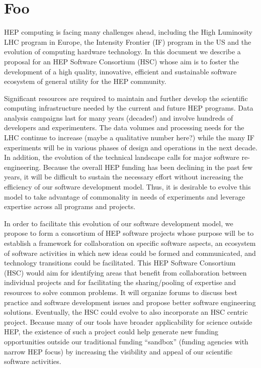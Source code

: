 \documentclass[12pt,letterpaper,fleqn]{article}
\begin{document}
\linenumbers

\section{Foo}
\label{sec:intro}

HEP computing is facing many challenges ahead, including the High
Luminosity LHC program in Europe, the Intensity Frontier (IF) program
in the US and the evolution of computing hardware technology. In
this document we describe a proposal for an HEP Software Consortium
(HSC) whose aim is to foster the development of a high quality,
innovative, efficient and sustainable software ecosystem of general
utility for the HEP community.

Significant resources are required to maintain and further develop
the scientific computing infrastructure needed by the current and
future HEP programs.  Data analysis campaigns last for many years
(decades!) and involve hundreds of developers and experimenters.
The data volumes and processing needs for the LHC continue to
increase (maybe a qualitative number here?) while the many IF
experiments will be in various phases of design and operations in
the next decade.  In addition, the evolution of the technical
landscape calls for major software re-engineering.  Because the
overall HEP funding has been declining in the past few years, it
will be difficult to sustain the necessary effort without increasing
the efficiency of our software development model.   Thus, it is
desirable to evolve this model to take advantage of commonality in
needs of experiments and leverage expertise across all programs and
projects.

In order to facilitate this evolution of our software development
model, we propose to form a consortium of HEP software projects
whose purpose will be to establish a framework for collaboration
on specific software aspects, an ecosystem of software activities
in which new ideas could be formed and communicated, and technology
transitions could be facilitated.  This HEP Software Consortium
(HSC) would aim for identifying areas that benefit from collaboration
between individual projects and for facilitating the sharing/pooling
of expertise and resources to solve common problems.  It will
organize forums to discuss best practice and software development
issues and propose better software engineering solutions.  Eventually,
the HSC could evolve to also incorporate an HSC centric project.
Because many of our tools have broader applicability for science
outside HEP, the existence of such a project could help generate
new funding opportunities outside our traditional funding “sandbox”
(funding agencies with narrow HEP focus) by increasing the visibility
and appeal of our scientific software activities.
\end{document}

